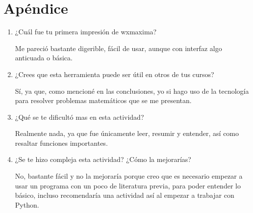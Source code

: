 \documentclass[12pt]{article}
\begin{document}
\section{Apéndice}
\begin{enumerate}
\item ¿Cuál fue tu primera impresión de wxmaxima?

Me pareció bastante digerible, fácil de usar, aunque con interfaz algo anticuada o básica.

\item ¿Crees que esta herramienta puede ser útil en otros de tus cursos?

Sí, ya que, como mencioné en las conclusiones, yo si hago uso de la tecnología para resolver problemas matemáticos que se me presentan.

\item ¿Qué se te dificultó mas en esta actividad?

Realmente nada, ya que fue únicamente leer, resumir y entender, así como resaltar funciones importantes.

\item ¿Se te hizo compleja esta actividad? ¿Cómo la mejorarías? 

No, bastante fácil y no la mejoraría porque creo que es necesario empezar a usar un programa con un poco de literatura previa, para poder entender lo básico, incluso recomendaría una actividad así al empezar a trabajar con Python. 

\end{enumerate}
\end{document}
